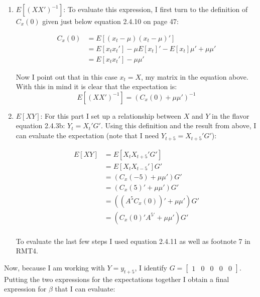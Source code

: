 \documentclass{homework}
\begin{document}
\begin{homeworkProblem}[Problem 2.4]
{\begin{enumerate}[a.]
        \begin{enumerate}
          \item $E\left[(XX')^{-1}\right]$: To evaluate this expression, I first turn to the definition of $C_x(0)$ given just below equation 2.4.10 on page 47:

            \begin{align*}
              C_x(0) &= E\left[\left( x_t - \mu\right) \left(x_t - \mu \right)' \right] \\
                &= E[x_tx_t'] - \mu E[x_t]' - E[x_t]\mu' + \mu\mu' \\
                &= E[x_t x_t'] - \mu\mu'
            \end{align*}

            Now I point out that in this case $x_t = X$, my matrix in the equation above. With this in mind it is clear that the expectation is: $$ E\left[ (XX')^{-1}\right] = \left(C_x(0) + \mu\mu' \right)^{-1}$$

          \item $E[XY]$: For this part I set up a relationship between $X$ and $Y$ in the flavor equation 2.4.3b: $Y_t = X_t'G'$. Using this definition and the result from above, I can evaluate the expectation (note that I need $Y_{t+5} = X_{t+5}' G'$):

            \begin{align*}
              E[XY] &= E[X_t X_{t+5}' G'] \\
                &= E[X_t X_{t-5}'] G' \\
                &= \left(C_x(-5) + \mu\mu' \right) G' \\
                &= \left( C_x(5)' + \mu \mu' \right) G' \\
                &= \left( \left(A^5 C_x(0)  \right)' + \mu \mu' \right) G' \\
                &= \left( C_x(0)' A^{5'} + \mu \mu' \right) G' \\
            \end{align*}

            To evaluate the last few steps I used equation 2.4.11 as well as footnote 7 in RMT4.

        \end{enumerate}

        Now, because I am working with $Y = y_{t+5}$, I identify $G = \left[\begin{matrix} 1 & 0 & 0 & 0 &0 \end{matrix}\right]$. Putting the two expressions for the expectations together I obtain a final expression for $\beta$ that I can evaluate:


\end{enumerate}}
\end{homeworkProblem}
\end{document}

